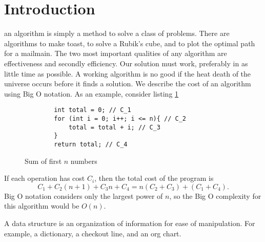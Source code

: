 \section{Introduction}
an algorithm is simply a method
to solve a class of problems.
There are algorithms to make
toast, to solve a Rubik's cube,
and to plot the optimal path
for a mailmain.
The two most important qualities
of any algorithm are effectiveness
and secondly efficiency. Our solution
must work, preferably in as little
time as possible. A working algorithm
is no good if the heat death of the
universe occurs before it finds a
solution.
We describe the cost of an algorithm
using Big O notation. As an example,
consider listing \ref{lst:nsum}
\begin{figure}
    \begin{lstlisting}
        int total = 0; // C_1
        for (int i = 0; i++; i <= n){ // C_2
            total = total + i; // C_3
        }
        return total; // C_4
    \end{lstlisting}
    \caption{Sum of first $n$ numbers}
    \label{lst:nsum}
\end{figure}
If each operation has cost $C_i$,
then the total cost of the program is
\begin{equation}
    C_1 + C_2 (n + 1) + C_3 n + C_4 = n(C_2 + C_3) + (C_1 + C_4).
\end{equation}
Big O notation considers only
the largest power of $n$, so the Big O complexity
for this algorithm would be $O(n)$.

A data structure is an
organization of information for
ease of manipulation. For
example, a dictionary,
a checkout line, and an
org chart.